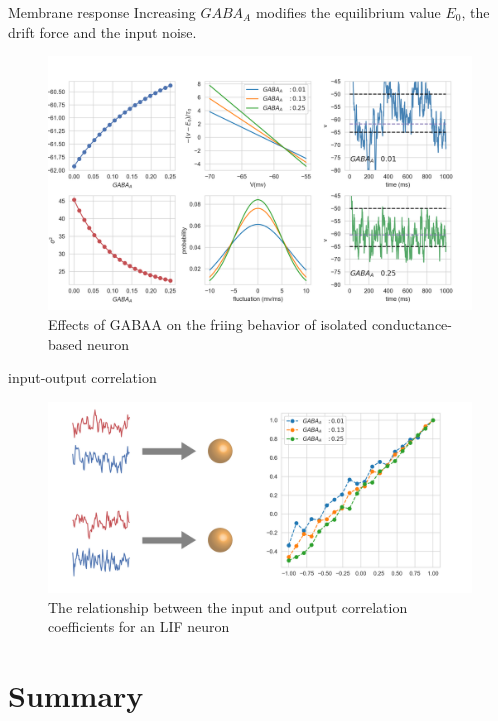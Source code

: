 \documentclass{beamer}
\begin{document}
\begin{frame}{Membrane response}
	Increasing $ GABA_{A} $ modifies the equilibrium value $ E_{0} $, the drift force and the input noise.
	\begin{figure}[htbp]
		\centering
		\includegraphics[width=0.75\linewidth]{fig/diffusion_theorem}
		\caption{Effects of GABAA on the friing behavior of isolated conductance-based neuron}
	\end{figure}
\end{frame}
\begin{frame}{input-output correlation}
		\begin{figure}[htbp]
		\centering
		\includegraphics[width=0.85\linewidth]{fig/correlate}
		\caption{The relationship between the input and output correlation coefficients for an LIF neuron}
	\end{figure}
\end{frame}

\section*{Summary}
\end{document}
